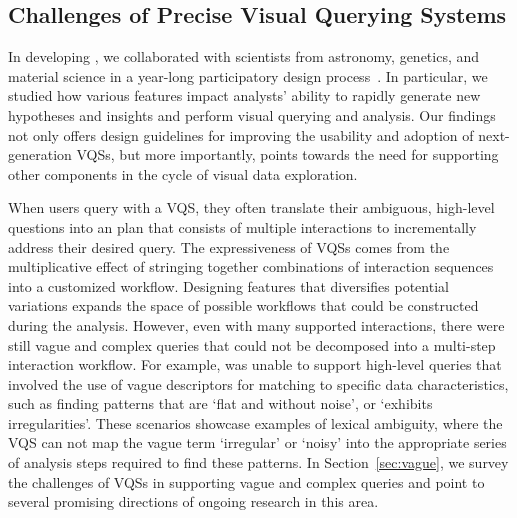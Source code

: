 \subsection{Challenges of Precise Visual Querying Systems}
\par In developing \zv, we collaborated with scientists from astronomy, genetics, and material science in a year-long participatory design process~\cite{Lee2017}. In particular, we studied how various features impact analysts' ability to rapidly generate new hypotheses and insights and perform visual querying and analysis. Our findings not only offers design guidelines for improving the usability and adoption of next-generation VQSs, but more importantly, points towards the need for supporting other components in the cycle of visual data exploration. %

\par When users query with a VQS, they often translate their ambiguous, high-level questions into an plan that consists of multiple interactions to incrementally address their desired query. The expressiveness of VQSs comes from the multiplicative effect of stringing together combinations of interaction sequences into a customized workflow. Designing features that diversifies potential variations expands the space of possible workflows that could be constructed during the analysis. However, even with many supported interactions, there were still vague and complex queries that could not be decomposed into a multi-step interaction workflow. For example, \zv was unable to support high-level queries that involved the use of vague descriptors for matching to specific data characteristics, such as finding patterns that are `flat and without noise', or `exhibits irregularities'. These scenarios showcase examples of lexical ambiguity, where the VQS can not map the vague term `irregular' or `noisy' into the appropriate series of analysis steps required to find these patterns. In Section~\ref{sec:vague}, we survey the challenges of VQSs in supporting vague and complex queries and point to several promising directions of ongoing research in this area.


